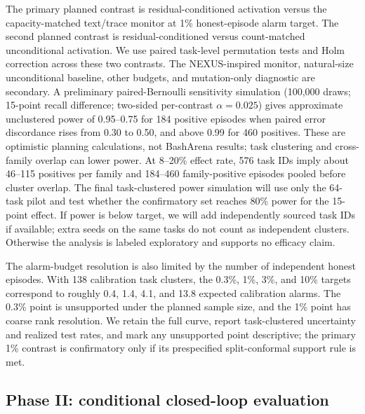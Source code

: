 \documentclass[11pt]{article}
\begin{document}
The primary planned contrast is residual-conditioned activation versus the capacity-matched text/trace monitor at 1\% honest-episode alarm target. The second planned contrast is residual-conditioned versus count-matched unconditional activation. We use paired task-level permutation tests and Holm correction across these two contrasts. The NEXUS-inspired monitor, natural-size unconditional baseline, other budgets, and mutation-only diagnostic are secondary. A preliminary paired-Bernoulli sensitivity simulation (100,000 draws; 15-point recall difference; two-sided per-contrast $\alpha=0.025$) gives approximate unclustered power of 0.95--0.75 for 184 positive episodes when paired error discordance rises from 0.30 to 0.50, and above 0.99 for 460 positives. These are optimistic planning calculations, not BashArena results; task clustering and cross-family overlap can lower power. At 8--20\% effect rate, 576 task IDs imply about 46--115 positives per family and 184--460 family-positive episodes pooled before cluster overlap. The final task-clustered power simulation will use only the 64-task pilot and test whether the confirmatory set reaches 80\% power for the 15-point effect. If power is below target, we will add independently sourced task IDs if available; extra seeds on the same tasks do not count as independent clusters. Otherwise the analysis is labeled exploratory and supports no efficacy claim.

The alarm-budget resolution is also limited by the number of independent honest episodes. With 138 calibration task clusters, the 0.3\%, 1\%, 3\%, and 10\% targets correspond to roughly 0.4, 1.4, 4.1, and 13.8 expected calibration alarms. The 0.3\% point is unsupported under the planned sample size, and the 1\% point has coarse rank resolution. We retain the full curve, report task-clustered uncertainty and realized test rates, and mark any unsupported point descriptive; the primary 1\% contrast is confirmatory only if its prespecified split-conformal support rule is met.

\subsection{Phase II: conditional closed-loop evaluation}
\end{document}
